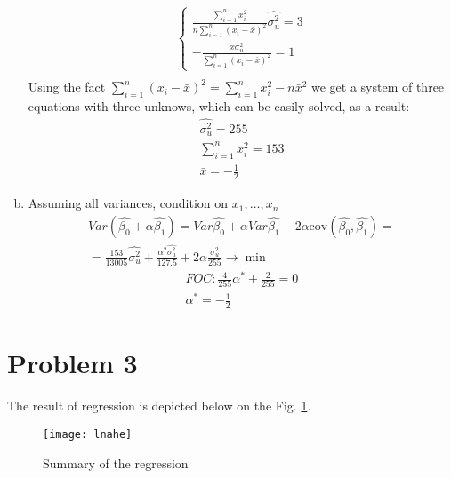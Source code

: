 \documentclass[a4paper]{article}
\newcommand{\summa}{\sum_{i=1}^n}
\begin{document}
\begin{enumerate}[(a)]
\begin{align*}
\begin{cases}
	\frac{\summa x_i^2}{n\summa(x_i - \bar{x})^2}\hat{\sigma_u^2} = 3\\
	-\frac{\bar{x} \sigma^2_u}{\summa (x_i - \bar{x})^2} = 1
	\end{cases}\\
	\end{align*}
	Using the fact $\summa (x_i - \bar{x})^2 = \summa x_i^2 - n\bar{x}^2$ we get a system of three equations with three unknows, which can be easily solved, as a result:
	\begin{align*}
	\hat{\sigma^2_u} = 255\\
	\summa x_i^2 = 153\\
	\bar{x} = -\frac{1}{2}
	\end{align*}
	\item Assuming all variances, condition on $x_1, \dots, x_n$
	\begin{align*}
	Var(\hat{\beta_0} + \alpha \hat{\beta_1}) = Var\hat{\beta_0} + \alpha Var \hat{\beta_1} -2\alpha \text{cov}(\hat{\beta_0}, \hat{\beta_1}) =\\
	=\frac{153}{13005}\hat{\sigma_u^2} + \frac{\alpha^2 \hat{\sigma^2_u}}{127.5} + 2\alpha \frac{ \sigma^2_u}{255} \to \min
	\end{align*}
	\begin{align*}
	FOC: \frac{4}{255} \alpha^* + \frac{2}{255} = 0\\
	\alpha^* = -\frac{1}{2}
	\end{align*}
\end{enumerate}
\section*{Problem 3}
The result of regression is depicted below on the Fig. \ref{fig1}.


\begin{figure}[h]
	\centering
	\texttt{[image: lnahe]}
	\caption{Summary of the regression}\label{fig1}
\end{figure}
\end{document}
